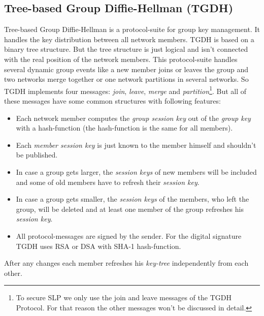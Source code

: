\subsection{Tree-based Group Diffie-Hellman (TGDH)}\label{sec:TGDH}
Tree-based Group Diffie-Hellman is a protocol-suite for group key management. It handles the key distribution between all network members. TGDH is based on a binary tree structure. But the tree structure is just logical and isn't connected with the real position of the network members. This protocol-suite handles several dynamic group events like a new member joins or leaves the group and two networks merge together or one network partitions in several networks. So TGDH implements four messages: \textsl{join}, \textsl{leave}, \textsl{merge} and \textsl{partition}\footnote{To secure SLP we only use the join and leave messages of the TGDH Protocol. For that reason the other messages won't be discussed in detail.}. But all of these messages have some common structures with following features:
\begin{itemize}
  \item Each network member computes the \textsl{group session key} out of the \textsl{group key} with a hash-function (the hash-function is the same for all members).
  \item Each \textsl{member session key} is just known to the member himself and shouldn't be published.
  \item In case a group gets larger, the \textsl{session keys} of new members will be included and some of old members have to refresh their \textsl{session key}.
  \item In case a group gets smaller, the \textsl{session keys} of the members, who left the group, will be deleted and at least one member of the group refreshes his \textsl{session key}.
  \item All protocol-messages are signed by the sender. For the digital signature TGDH uses RSA or DSA with SHA-1 hash-function. 
\end{itemize}
After any changes each member refreshes his \textsl{key-tree} independently from each other.\\

